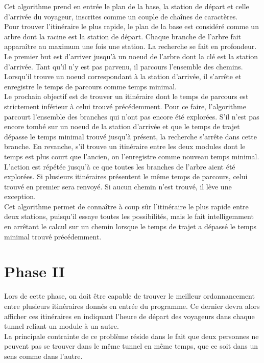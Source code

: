 \documentclass[11pt, a4paper, twoside, titlepage]{article}
\begin{document}
Cet algorithme prend en entrée le plan de la base, la station de départ et celle d'arrivée du voyageur, inscrites comme un couple de chaînes de caractères.\\

Pour trouver l'itinéraire le plus rapide, le plan de la base est considéré comme un arbre dont la racine est la station de départ. Chaque branche de l'arbre fait apparaître au maximum une fois une station. La recherche se fait en profondeur.\\
Le premier but est d'arriver jusqu'à un noeud de l'arbre dont la clé est la station d'arrivée. Tant qu'il n'y est pas parvenu, il parcours l'ensemble des chemins. Lorsqu'il trouve un noeud correspondant à la station d'arrivée, il s'arrête et enregistre le temps de parcours comme temps minimal.\\
Le prochain objectif est de trouver un itinéraire dont le temps de parcours est strictement inférieur à celui trouvé précédemment. Pour ce faire, l'algorithme parcourt l'ensemble des branches qui n'ont pas encore été explorées. S'il n'est pas encore tombé sur un noeud de la station d'arrivée et que le temps de trajet dépasse le temps minimal trouvé jusqu'à présent, la recherche s'arrête dans cette branche. En revanche, s'il trouve un itinéraire entre les deux modules dont le temps est plus court que l'ancien, on l'enregistre comme nouveau temps minimal.\\
L'action est répétée jusqu'à ce que toutes les branches de l'arbre aient été explorées.
Si plusieurs itinéraires présentent le même temps de parcours, celui trouvé en premier sera renvoyé. Si aucun chemin n'est trouvé, il lève une exception.\\

Cet algorithme permet de connaître à coup sûr l'itinéraire le plus rapide entre deux stations, puisqu'il essaye toutes les possibilités, mais le fait intelligemment en arrêtant le calcul sur un chemin lorsque le temps de trajet a dépassé le temps minimal trouvé précédemment.\\

\clearpage

\section{Phase II}

Lors de cette phase, on doit être capable de trouver le meilleur ordonnancement entre plusieurs itinéraires donnés en entrée du programme. Ce dernier devra alors afficher ces itinéraires en indiquant l'heure de départ des voyageurs dans chaque tunnel reliant un module à un autre.\\
La principale contrainte de ce problème réside dans le fait que deux personnes ne peuvent pas se trouver dans le même tunnel en même temps, que ce soit dans un sens comme dans l'autre.\\
\end{document}
